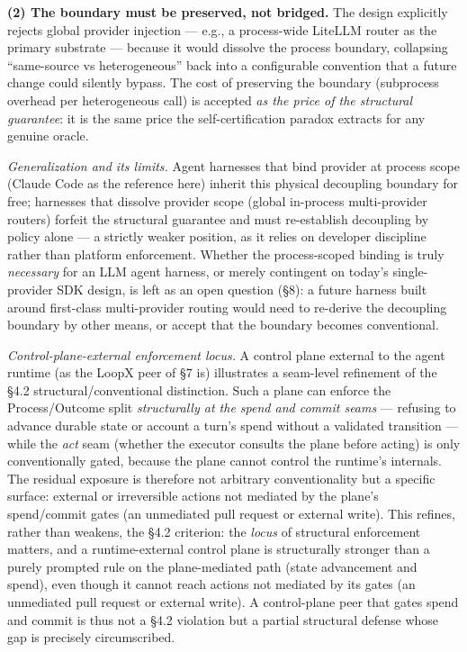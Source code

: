 \documentclass[
  11pt,
]{article}
\begin{document}
\textbf{(2) The boundary must be preserved, not bridged.} The design
explicitly rejects global provider injection --- e.g., a process-wide
LiteLLM router as the primary substrate --- because it would dissolve
the process boundary, collapsing ``same-source vs heterogeneous'' back
into a configurable convention that a future change could silently
bypass. The cost of preserving the boundary (subprocess overhead per
heterogeneous call) is accepted \emph{as the price of the structural
guarantee}: it is the same price the self-certification paradox extracts
for any genuine oracle.

\emph{Generalization and its limits.} Agent harnesses that bind provider
at process scope (Claude Code as the reference here) inherit this
physical decoupling boundary for free; harnesses that dissolve provider
scope (global in-process multi-provider routers) forfeit the structural
guarantee and must re-establish decoupling by policy alone --- a
strictly weaker position, as it relies on developer discipline rather
than platform enforcement. Whether the process-scoped binding is truly
\emph{necessary} for an LLM agent harness, or merely contingent on
today's single-provider SDK design, is left as an open question (§8): a
future harness built around first-class multi-provider routing would
need to re-derive the decoupling boundary by other means, or accept that
the boundary becomes conventional.

\emph{Control-plane-external enforcement locus.} A control plane
external to the agent runtime (as the LoopX peer of §7 is) illustrates a
seam-level refinement of the §4.2 structural/conventional distinction.
Such a plane can enforce the Process/Outcome split \emph{structurally at
the spend and commit seams} --- refusing to advance durable state or
account a turn's spend without a validated transition --- while the
\emph{act} seam (whether the executor consults the plane before acting)
is only conventionally gated, because the plane cannot control the
runtime's internals. The residual exposure is therefore not arbitrary
conventionality but a specific surface: external or irreversible actions
not mediated by the plane's spend/commit gates (an unmediated pull
request or external write). This refines, rather than weakens, the §4.2
criterion: the \emph{locus} of structural enforcement matters, and a
runtime-external control plane is structurally stronger than a purely
prompted rule on the plane-mediated path (state advancement and spend),
even though it cannot reach actions not mediated by its gates (an
unmediated pull request or external write). A control-plane peer that
gates spend and commit is thus not a §4.2 violation but a partial
structural defense whose gap is precisely circumscribed.
\end{document}
